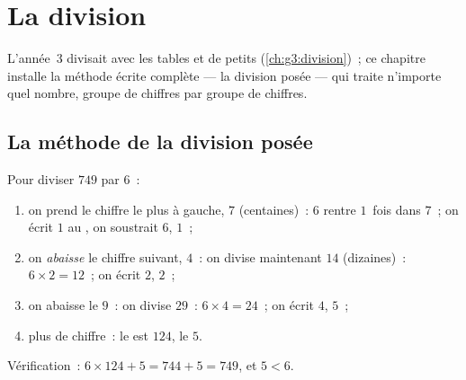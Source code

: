 \chapter{La division}\label{ch:g4:division}

L'année~3 divisait avec les tables et de petits 
(\cref{ch:g3:division})~; ce chapitre installe la méthode écrite
complète --- la division posée --- qui traite n'importe quel nombre,
groupe de chiffres par groupe de chiffres.

\section{La méthode de la division posée}

\begin{method}\label{met:g4:division:method}
Pour diviser $749$ par $6$~:
\begin{enumerate}
  \item on prend le chiffre le plus à gauche, $7$ (centaines)~: $6$
        rentre $1$~fois dans $7$~; on écrit $1$ au , on
        soustrait $6$,  $1$~;
  \item on \emph{abaisse} le chiffre suivant, $4$~: on divise
        maintenant $14$ (dizaines)~: $6 \times 2 = 12$~; on écrit
        $2$,  $2$~;
  \item on abaisse le $9$~: on divise $29$~: $6 \times 4 = 24$~; on
        écrit $4$,  $5$~;
  \item plus de chiffre~: le  est $124$, le  $5$.
\end{enumerate}
Vérification~: $6 \times 124 + 5 = 744 + 5 = 749$, et $5 < 6$.
\end{method}

